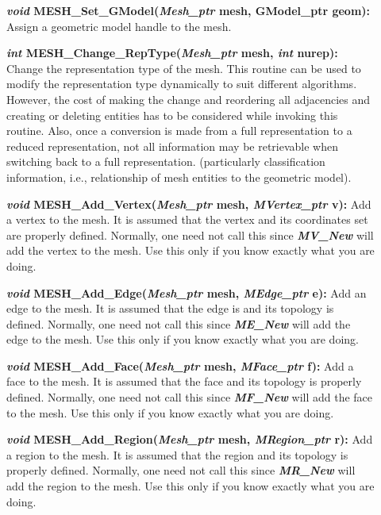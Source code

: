 \documentclass[12pt]{article}
\begin{document}
\begin{description}
\item[]
  

\item[]\textbf{\textit{void} MESH\_Set\_GModel(\textit{Mesh\_ptr} mesh,
GModel\_ptr geom):} Assign a geometric model handle to the mesh.

\item[]\textbf{\textit{int} MESH\_Change\_RepType(\textit{Mesh\_ptr} mesh,
\textit{int} nurep):} Change the representation type of the mesh. This
routine can be used to modify the representation type dynamically to
suit different algorithms.  However, the cost of making the change and
reordering all adjacencies and creating or deleting entities has to be
considered while invoking this routine. Also, once a conversion is
made from a full representation to a reduced representation, not all
information may be retrievable when switching back to a full
representation.  (particularly classification information, i.e.,
relationship of mesh entities to the geometric model).

\item[]

\item[]\textbf{\textit{void} MESH\_Add\_Vertex(\textit{Mesh\_ptr}
    mesh, \textit{MVertex\_ptr} v):} Add a vertex to the mesh. It is
  assumed that the vertex and its coordinates set are properly
  defined. Normally, one need not call this since
  \textbf{\textit{MV\_New}} will add the vertex to the mesh. Use this
  only if you know exactly what you are doing.

\item[]\textbf{\textit{void} MESH\_Add\_Edge(\textit{Mesh\_ptr} mesh,
    \textit{MEdge\_ptr} e):} Add an edge to the mesh. It is assumed
  that the edge is and its topology is defined. Normally, one need not
  call this since \textbf{\textit{ME\_New}} will add the edge to the
  mesh. Use this only if you know exactly what you are doing.

\item[]\textbf{\textit{void} MESH\_Add\_Face(\textit{Mesh\_ptr} mesh,
    \textit{MFace\_ptr} f):} Add a face to the mesh. It is assumed
  that the face and its topology is properly defined. Normally, one
  need not call this since \textbf{\textit{MF\_New}} will add the face
  to the mesh. Use this only if you know exactly what you are doing.

\item[]\textbf{\textit{void} MESH\_Add\_Region(\textit{Mesh\_ptr}
    mesh, \textit{MRegion\_ptr} r):} Add a region to the mesh. It is
  assumed that the region and its topology is properly defined.
  Normally, one need not call this since \textbf{\textit{MR\_New}}
  will add the region to the mesh. Use this only if you know exactly
  what you are doing.


\end{description}
\end{document}

